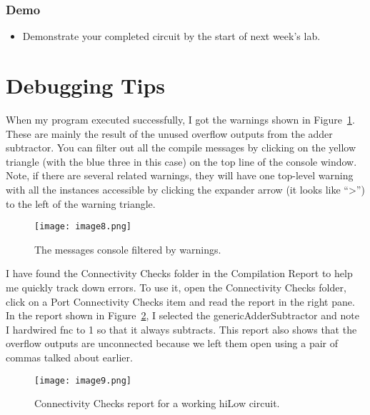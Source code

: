 \subsubsection{Demo}
\begin{itemize}
\item Demonstrate your completed circuit by the start of next week's lab.
\end{itemize}

\section{Debugging Tips}

When my program executed successfully, I got the warnings shown in
Figure~\ref{fig:messageConsole}. These are mainly the result of the unused overflow outputs
from the adder subtractor. You can filter out all the compile messages
by clicking on the yellow triangle (with the blue three in this case) on
the top line of the console window. Note, if there are several related
warnings, they will have one top-level warning with all the instances
accessible by clicking the expander arrow (it looks like
``\textgreater'') to the left of the warning triangle.

\begin{figure}[ht]
\texttt{[image: image8.png]}
\caption{The messages console filtered by warnings.}
\label{fig:messageConsole}
\end{figure}

I have found the Connectivity Checks folder in the Compilation Report to
help me quickly track down errors. To use it, open the Connectivity
Checks folder, click on a Port Connectivity Checks item and read the
report in the right pane. In the report shown in Figure~\ref{fig:connectivityCheck}, I selected
the genericAdderSubtractor and note I hardwired fnc to 1 so that it
always subtracts. This report also shows that the overflow outputs are
unconnected because we left them open using a pair of commas talked
about earlier.

\begin{figure}[ht]
\texttt{[image:  image9.png]}
\caption{Connectivity Checks report for a working hiLow circuit.}
\label{fig:connectivityCheck}
\end{figure}

